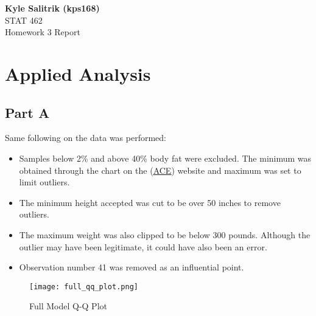 \documentclass[a4paper, 11pt]{article}
\begin{document}
\graphicspath{{./figures/}}
\noindent
\large\textbf{Kyle Salitrik (kps168)} \\
\normalsize STAT 462\\
\large{Homework 3 Report} \hfill 







\section*{Applied Analysis}
\subsection*{Part A}
Same following on the data was performed:
\begin{itemize}
	\item Samples below 2\% and above 40\% body fat were excluded. The minimum was obtained through the chart on the (\href{''https://www.acefitness.org/acefit/healthy-living-article/60/112/what-are-the-guidelines-for-percentage-of-body-fat-loss''}{\underline{ACE}}) website and maximum was set to limit outliers.
	\item The minimum height accepted was cut to be over 50 inches to remove outliers.
	\item The maximum weight was also clipped to be below 300 pounds. Although the outlier may have been legitimate, it could have also been an error.
	\item Observation number 41 was removed as an influential point.
\end{itemize}

\begin{figure}[H]
	\centering
	\caption{Full Model Q-Q Plot}
	\centerline{\texttt{[image: full\_qq\_plot.png]}}
\end{figure}



%
\end{document}
